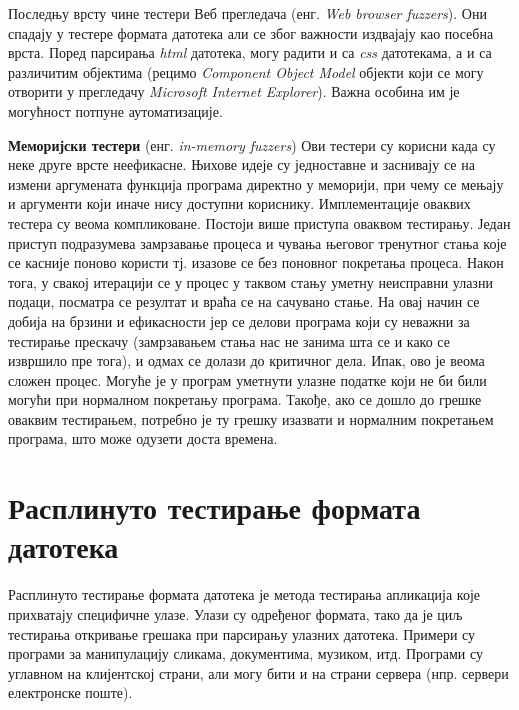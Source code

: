 \documentclass[12pt,oneside]{memoir}
\begin{document}
\begin{description}
Последњу врсту чине тестери Веб прегледача (енг. \textit{Web browser fuzzers}). Они спадају у тестере формата датотека али се због важности издвајају као посебна врста. Поред парсирања \textit{html} датотека, могу радити и са \textit{css} датотекама, а и са различитим објектима (рецимо \textit{Component Object Model} објекти који се могу отворити у прегледачу \textit{Microsoft Internet Explorer}). Важна особина им је могућност потпуне аутоматизације.
\item \textbf{Меморијски тестери} (енг. \textit{in-memory fuzzers}) Ови тестери су корисни када су неке друге врсте неефикасне. Њихове идеје су једноставне и заснивају се на измени аргумената функција програма директно у меморији, при чему се мењају и аргументи који иначе нису доступни кориснику. Имплементације оваквих тестера су веома компликоване. Постоји више приступа оваквом тестирању. Један приступ подразумева замрзавање процеса и чувања његовог тренутног стања које се касније поново користи тј. изазове се без поновног покретања процеса. Након тога, у свакој итерацији се у процес у таквом стању уметну неисправни улазни подаци, посматра се резултат и враћа се на сачувано стање. На овај начин се добија на брзини и ефикасности јер се делови програма који су неважни за тестирање прескачу (замрзавањем стања нас не занима шта се и како се извршило пре тога), и одмах се долази до критичног дела. Ипак, ово је веома сложен процес. Могуће је у програм уметнути улазне податке који не би били могући при нормалном покретању програма. Такође, ако се дошло до грешке оваквим тестирањем, потребно је ту грешку изазвати и нормалним покретањем програма, што може одузети доста времена.
\end{description}

\section{Расплинуто тестирање формата датотека}
\label{sec:rasTestFormFajl}

Расплинуто тестирање формата датотека  је метода тестирања апликација које прихватају специфичне улазе. Улази су одређеног формата, тако да је циљ тестирања откривање грешака при парсирању улазних датотека. Примери су програми за манипулацију сликама, документима, музиком, итд. Програми су углавном на клијентској страни, али могу бити и на страни сервера (нпр. сервери електронске поште).
\end{document}
